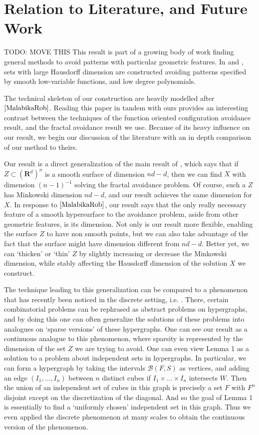 \documentclass{article}
\theoremstyle{plain}
\theoremstyle{plain}
\begin{document}
\section{Relation to Literature, and Future Work}

TODO: MOVE THIS
This result is part of a growing body of work finding general methods to avoid patterns with particular geometric features. In \cite{MalabikaRob} and \cite{Mathe}, sets with large Hausdorff dimension are constructed avoiding patterns specified by smooth low-variable functions, and low degree polynomials.

The technical skeleton of our construction are heavily modelled after $\cite{MalabikaRob}$. Reading this paper in tandem with ours provides an interesting contrast between the techniques of the function oriented configuration avoidance result, and the fractal avoidance result we use. Because of its heavy influence on our result, we begin our discussion of the literature with an in depth comparison of our method to theirs.

Our result is a direct generalization of the main result of \cite{MalabikaRob}, which says that if $Z \subset (\mathbf{R}^d)^n$ is a smooth surface of dimension $nd - d$, then we can find $X$ with dimension $(n-1)^{-1}$ solving the fractal avoidance problem. Of course, such a $Z$ has Minkowski dimension $nd - d$, and our result achieves the same dimension for $X$. In response to $\cite{MalabikaRob}$, our result says that the only really necessary feature of a smooth hypersurface to the avoidance problem, aside from other geometric features, is its dimension. Not only is our result more flexible, enabling the surface $Z$ to have non smooth points, but we can also take advantage of the fact that the surface might have dimension different from $nd - d$. Better yet, we can `thicken' or `thin' $Z$ by slightly increasing or decrease the Minkowski dimension, while stably affecting the Hausdorff dimension of the solution $X$ we construct.

The technique leading to this generalization can be compared to a phenomenon that has recently been noticed in the discrete setting, i.e. \cite{BaloghMorrisSamotij}. There, certain combinatorial problems can be rephrased as abstract problems on hypergraphs, and by doing this one can often generalize the solutions of these problems into analogues on `sparse versions' of these hypergraphs. One can see our result as a continuous analogue to this phenomenon, where sparsity is represented by the dimension of the set $Z$ we are trying to avoid. One can even view Lemma 1 as a solution to a problem about independent sets in hypergraphs. In particular, we can form a hypergraph by taking the intervals $\mathcal{B}(F,S)$ as vertices, and adding an edge $(I_1, \dots, I_n)$ between $n$ distinct cubes if $I_1 \times \dots \times I_n$ intersects $W$. Then the union of an independent set of cubes in this graph is precisely a set $F$ with $F^n$ disjoint except on the discretization of the diagonal. And so the goal of Lemma 1 is essentially to find a `uniformly chosen' independent set in this graph. Thus we even applied the discrete phenomenon at many scales to obtain the continuous version of the phenomenon.
\end{document}

